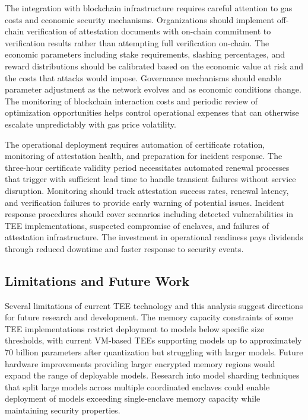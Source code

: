 The integration with blockchain infrastructure requires careful attention to gas costs and economic security mechanisms. Organizations should implement off-chain verification of attestation documents with on-chain commitment to verification results rather than attempting full verification on-chain. The economic parameters including stake requirements, slashing percentages, and reward distributions should be calibrated based on the economic value at risk and the costs that attacks would impose. Governance mechanisms should enable parameter adjustment as the network evolves and as economic conditions change. The monitoring of blockchain interaction costs and periodic review of optimization opportunities helps control operational expenses that can otherwise escalate unpredictably with gas price volatility.

The operational deployment requires automation of certificate rotation, monitoring of attestation health, and preparation for incident response. The three-hour certificate validity period necessitates automated renewal processes that trigger with sufficient lead time to handle transient failures without service disruption. Monitoring should track attestation success rates, renewal latency, and verification failures to provide early warning of potential issues. Incident response procedures should cover scenarios including detected vulnerabilities in TEE implementations, suspected compromise of enclaves, and failures of attestation infrastructure. The investment in operational readiness pays dividends through reduced downtime and faster response to security events.

\subsection{Limitations and Future Work}

Several limitations of current TEE technology and this analysis suggest directions for future research and development. The memory capacity constraints of some TEE implementations restrict deployment to models below specific size thresholds, with current VM-based TEEs supporting models up to approximately 70 billion parameters after quantization but struggling with larger models. Future hardware improvements providing larger encrypted memory regions would expand the range of deployable models. Research into model sharding techniques that split large models across multiple coordinated enclaves could enable deployment of models exceeding single-enclave memory capacity while maintaining security properties.


